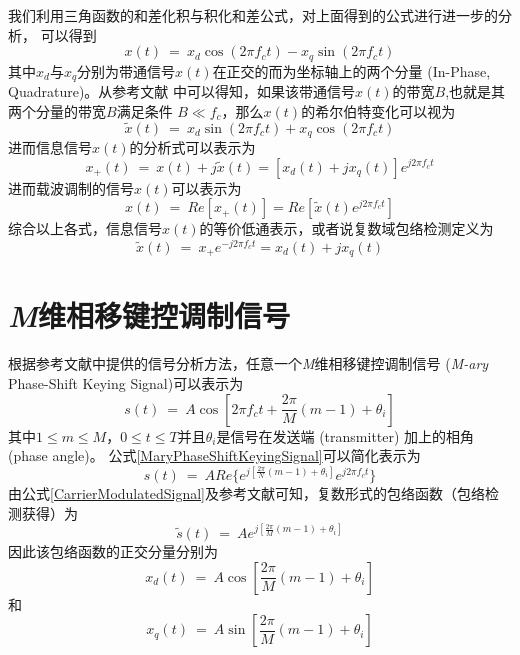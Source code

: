 \par
我们利用三角函数的和差化积与积化和差公式，对上面得到的公式进行进一步的分析，
可以得到
\begin{equation}%
    x(t) ~=~ x_{d}\cos(2\pi f_{c}t) - x_{q}\sin(2\pi f_{c}t)
\end{equation}
其中$x_{d}$与$x_{q}$分别为带通信号$x(t)$在正交的而为坐标轴上的两个分量 (In-Phase, Quadrature)。从参考文献
中可以得知，如果该带通信号$x(t)$的带宽$B$,也就是其两个分量的带宽$B$满足条件
$B \ll f_{c}$，那么$x(t)$的希尔伯特变化可以视为
\begin{equation}%
    \tilde{x}(t) ~=~ x_{d}\sin(2\pi f_{c}t) + x_{q}\cos(2\pi f_{c}t)
\end{equation}
进而信息信号$x(t)$的分析式可以表示为
\begin{equation}%
    x_{+}(t) ~=~ x(t) + j\tilde{x}(t) = [x_{d}(t) + jx_{q}(t)]e^{j2\pi f_{c}t}
\end{equation}
进而载波调制的信号$x(t)$可以表示为
\begin{equation} \label{CarrierModulatedSignal}
    x(t) ~=~ Re[x_{+}(t)] = Re[\tilde{x}(t)e^{j2\pi f_{c}t}]
\end{equation}
综合以上各式，信息信号$x(t)$的等价低通表示，或者说复数域包络检测定义为
\begin{equation}%
    \tilde{x}(t) ~=~ x_{+}e^{-j2\pi f_{c}t} = x_{d}(t) + jx_{q}(t)
\end{equation}

\section{\emph{M}维相移键控调制信号}
根据参考文献中提供的信号分析方法，任意一个\emph{M}维相移键控调制信号
 (\emph{M-ary} Phase-Shift Keying Signal)可以表示为
 \begin{equation} \label{MaryPhaseShiftKeyingSignal}
    s(t) ~=~ A\cos[2\pi f_{c}t+\frac{2\pi}{M}(m-1)+\theta_{i}]
 \end{equation}
 其中$1 \leq m \leq M$，$0 \leq t \leq T$并且$\theta_{i}$是信号在发送端 (transmitter) 加上的相角 (phase angle)。
 公式\eqref{MaryPhaseShiftKeyingSignal}可以简化表示为
 \begin{equation}%
    s(t) ~=~ ARe\{e^{j[\frac{2\pi}{N}(m-1)+\theta_{i}]}e^{j2\pi f_{c}t}\}
 \end{equation}
 由公式\eqref{CarrierModulatedSignal}及参考文献可知，复数形式的包络函数（包络检测获得）为
 \begin{equation}%
    \tilde{s}(t) ~=~ Ae^{j[\frac{2\pi}{M}(m-1)+\theta_{i}]}
 \end{equation}
 因此该包络函数的正交分量分别为
 \begin{equation}%
    x_{d}(t) ~=~ A\cos[\frac{2\pi}{M}(m-1)+\theta_{i}]
 \end{equation}
 和
 \begin{equation}%
    x_{q}(t) ~=~ A\sin[\frac{2\pi}{M}(m-1)+\theta_{i}]
 \end{equation}

